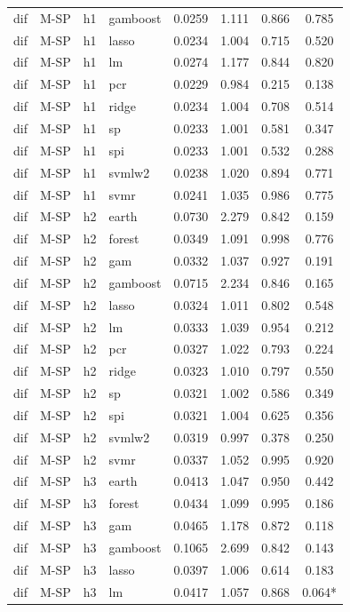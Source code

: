 \begin{ThreePartTable}
\begin{longtable}[t]{llclcccc}
dif & M-SP & h1 & gamboost & 0.0259 & 1.111 & 0.866 & 0.785\\
dif & M-SP & h1 & lasso & 0.0234 & 1.004 & 0.715 & 0.520\\
dif & M-SP & h1 & lm & 0.0274 & 1.177 & 0.844 & 0.820\\
dif & M-SP & h1 & pcr & 0.0229 & 0.984 & 0.215 & 0.138\\
dif & M-SP & h1 & ridge & 0.0234 & 1.004 & 0.708 & 0.514\\
dif & M-SP & h1 & sp & 0.0233 & 1.001 & 0.581 & 0.347\\
dif & M-SP & h1 & spi & 0.0233 & 1.001 & 0.532 & 0.288\\
dif & M-SP & h1 & svmlw2 & 0.0238 & 1.020 & 0.894 & 0.771\\
dif & M-SP & h1 & svmr & 0.0241 & 1.035 & 0.986 & 0.775\\
\addlinespace
dif & M-SP & h2 & earth & 0.0730 & 2.279 & 0.842 & 0.159\\
dif & M-SP & h2 & forest & 0.0349 & 1.091 & 0.998 & 0.776\\
dif & M-SP & h2 & gam & 0.0332 & 1.037 & 0.927 & 0.191\\
dif & M-SP & h2 & gamboost & 0.0715 & 2.234 & 0.846 & 0.165\\
dif & M-SP & h2 & lasso & 0.0324 & 1.011 & 0.802 & 0.548\\
dif & M-SP & h2 & lm & 0.0333 & 1.039 & 0.954 & 0.212\\
dif & M-SP & h2 & pcr & 0.0327 & 1.022 & 0.793 & 0.224\\
dif & M-SP & h2 & ridge & 0.0323 & 1.010 & 0.797 & 0.550\\
dif & M-SP & h2 & sp & 0.0321 & 1.002 & 0.586 & 0.349\\
dif & M-SP & h2 & spi & 0.0321 & 1.004 & 0.625 & 0.356\\
dif & M-SP & h2 & svmlw2 & 0.0319 & 0.997 & 0.378 & 0.250\\
dif & M-SP & h2 & svmr & 0.0337 & 1.052 & 0.995 & 0.920\\
\addlinespace
dif & M-SP & h3 & earth & 0.0413 & 1.047 & 0.950 & 0.442\\
dif & M-SP & h3 & forest & 0.0434 & 1.099 & 0.995 & 0.186\\
dif & M-SP & h3 & gam & 0.0465 & 1.178 & 0.872 & 0.118\\
dif & M-SP & h3 & gamboost & 0.1065 & 2.699 & 0.842 & 0.143\\
dif & M-SP & h3 & lasso & 0.0397 & 1.006 & 0.614 & 0.183\\
dif & M-SP & h3 & lm & 0.0417 & 1.057 & 0.868 & 0.064*\\

\end{longtable}
\end{ThreePartTable}

